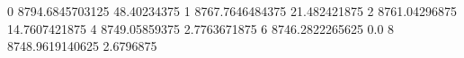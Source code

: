 0 8794.6845703125 48.40234375
1 8767.7646484375 21.482421875
2 8761.04296875 14.7607421875
4 8749.05859375 2.7763671875
6 8746.2822265625 0.0
8 8748.9619140625 2.6796875
